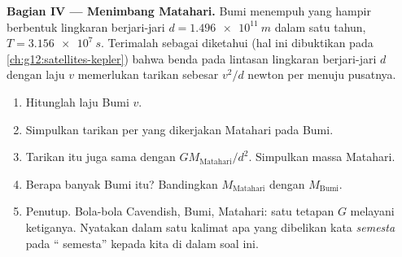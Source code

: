 \begin{problem}
\medskip
\noindent\textbf{Bagian IV --- Menimbang Matahari.}
Bumi menempuh  yang hampir berbentuk lingkaran berjari-jari
$d = \qty{1.496e11}{m}$ dalam satu tahun, $T = \qty{3.156e7}{s}$.
Terimalah sebagai diketahui (hal ini dibuktikan pada
\cref{ch:g12:satellites-kepler}) bahwa benda pada lintasan lingkaran
berjari-jari $d$ dengan laju $v$ memerlukan tarikan sebesar $v^2/d$
newton per  menuju pusatnya.
\begin{enumerate}[resume]
  \item Hitunglah laju  Bumi $v$.
  \item Simpulkan tarikan per  yang dikerjakan Matahari pada
        Bumi.
  \item Tarikan itu juga sama dengan $G M_{\text{Matahari}} / d^2$.
        Simpulkan massa Matahari.
  \item Berapa banyak Bumi itu? Bandingkan $M_{\text{Matahari}}$
        dengan $M_{\text{Bumi}}$.
  \item Penutup. Bola-bola Cavendish, Bumi, Matahari: satu tetapan $G$
        melayani ketiganya. Nyatakan dalam satu kalimat apa yang
        dibelikan kata \emph{semesta} pada `` semesta''
        kepada kita di dalam soal ini.
\end{enumerate}
\end{problem}
